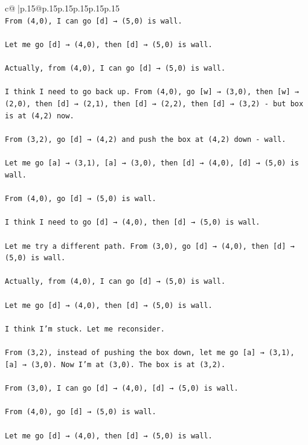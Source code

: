 \documentclass{article}
\begin{document}
{\begin{supertabular}{c@{$\;$}|p{.15\linewidth}@{}p{.15\linewidth}p{.15\linewidth}p{.15\linewidth}p{.15\linewidth}p{.15\linewidth}}
{{{\\ 
\texttt{From (4,0), I can go {[}d{]} → (5,0) is wall. } \\
\\ 
\texttt{Let me go {[}d{]} → (4,0), then {[}d{]} → (5,0) is wall. } \\
\\ 
\texttt{Actually, from (4,0), I can go {[}d{]} → (5,0) is wall. } \\
\\ 
\texttt{I think I need to go back up. From (4,0), go {[}w{]} → (3,0), then {[}w{]} → (2,0), then {[}d{]} → (2,1), then {[}d{]} → (2,2), then {[}d{]} → (3,2) {-} but box is at (4,2) now.} \\
\\ 
\texttt{From (3,2), go {[}d{]} → (4,2) and push the box at (4,2) down {-} wall.} \\
\\ 
\texttt{Let me go {[}a{]} → (3,1), {[}a{]} → (3,0), then {[}d{]} → (4,0), {[}d{]} → (5,0) is wall.} \\
\\ 
\texttt{From (4,0), go {[}d{]} → (5,0) is wall. } \\
\\ 
\texttt{I think I need to go {[}d{]} → (4,0), then {[}d{]} → (5,0) is wall. } \\
\\ 
\texttt{Let me try a different path. From (3,0), go {[}d{]} → (4,0), then {[}d{]} → (5,0) is wall. } \\
\\ 
\texttt{Actually, from (4,0), I can go {[}d{]} → (5,0) is wall. } \\
\\ 
\texttt{Let me go {[}d{]} → (4,0), then {[}d{]} → (5,0) is wall. } \\
\\ 
\texttt{I think I'm stuck. Let me reconsider.} \\
\\ 
\texttt{From (3,2), instead of pushing the box down, let me go {[}a{]} → (3,1), {[}a{]} → (3,0). Now I'm at (3,0). The box is at (3,2).} \\
\\ 
\texttt{From (3,0), I can go {[}d{]} → (4,0), {[}d{]} → (5,0) is wall. } \\
\\ 
\texttt{From (4,0), go {[}d{]} → (5,0) is wall. } \\
\\ 
\texttt{Let me go {[}d{]} → (4,0), then {[}d{]} → (5,0) is wall. } \\
}}}
\end{supertabular}}
\end{document}

